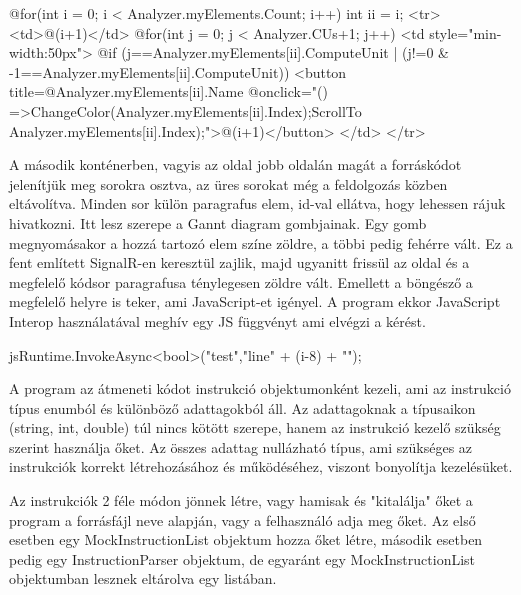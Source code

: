 \begin{cpp}
@for(int i = 0; i < Analyzer.myElements.Count; i++)
 {
   int ii = i;
   <tr>
      <td>@(i+1)</td>
      @for(int j = 0; j < Analyzer.CUs+1; j++)
        {
          <td style="min-width:50px">
          @if (j==Analyzer.myElements[ii].ComputeUnit | (j!=0 &
               -1==Analyzer.myElements[ii].ComputeUnit))
             {
                <button title=@Analyzer.myElements[ii].Name @onclick="()
                =>{ChangeColor(Analyzer.myElements[ii].Index);ScrollTo
                Analyzer.myElements[ii].Index);}">@(i+1)</button>
             }
          </td>
        }
   </tr>
 }
\end{cpp}


A második konténerben, vagyis az oldal jobb oldalán magát a forráskódot jelenítjük meg sorokra osztva, az üres sorokat még a feldolgozás közben eltávolítva. Minden sor külön paragrafus elem, id-val ellátva, hogy lehessen rájuk hivatkozni. Itt lesz szerepe a Gannt diagram gombjainak. Egy gomb megnyomásakor a hozzá tartozó elem színe zöldre, a többi pedig fehérre vált. Ez a fent említett SignalR-en keresztül zajlik, majd ugyanitt frissül az oldal és a megfelelő kódsor paragrafusa ténylegesen zöldre vált. Emellett a böngésző a megfelelő helyre is teker, ami JavaScript-et igényel. A program ekkor JavaScript Interop használatával meghív egy JS függvényt ami elvégzi a kérést.

\begin{cpp}
jsRuntime.InvokeAsync<bool>("test","line{" + (i-8) + "}");
\end{cpp}

A program az átmeneti kódot instrukció objektumonként kezeli, ami az instrukció típus enumból és különböző adattagokból áll. Az adattagoknak a típusaikon (string, int, double) túl nincs kötött szerepe, hanem az instrukció kezelő szükség szerint használja őket. Az összes adattag nullázható típus, ami szükséges az instrukciók korrekt létrehozásához és működéséhez, viszont bonyolítja kezelésüket.

Az instrukciók 2 féle módon jönnek létre, vagy hamisak és "kitalálja" őket a program a forrásfájl neve alapján, vagy a felhasználó adja meg őket. Az első esetben egy MockInstructionList objektum hozza őket létre, második esetben pedig egy InstructionParser objektum, de egyaránt egy MockInstructionList objektumban lesznek eltárolva egy listában.

